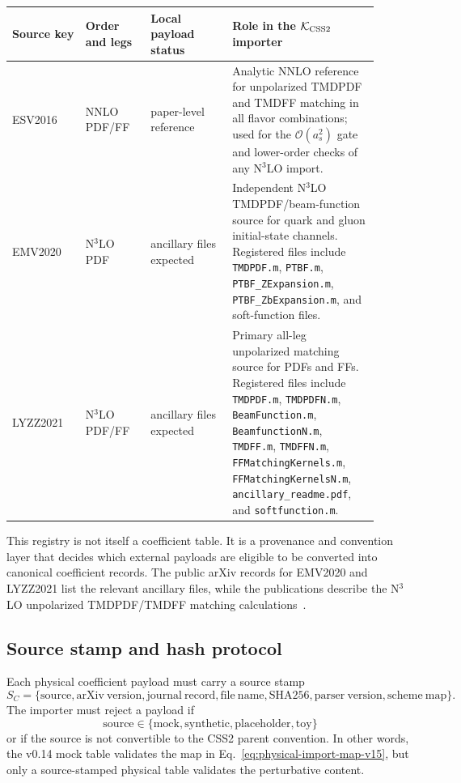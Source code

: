 \documentclass[11pt]{article}
\newcommand{\order}[1]{\mathcal{O}\!\left(#1\right)}
\newcommand{\KCSS}{\mathcal K_{\rm CSS2}}
\begin{document}
\begin{center}\small
\begin{tabular}{>{\raggedright\arraybackslash}p{0.18\linewidth}
                >{\raggedright\arraybackslash}p{0.16\linewidth}
                >{\raggedright\arraybackslash}p{0.20\linewidth}
                >{\raggedright\arraybackslash}p{0.36\linewidth}}
\toprule
Source key & Order and legs & Local payload status & Role in the $\KCSS$ importer \\
\midrule
ESV2016 & NNLO PDF/FF & paper-level reference & Analytic NNLO reference for unpolarized TMDPDF and TMDFF matching in all flavor combinations; used for the $\order{a_s^2}$ gate and lower-order checks of any N$^3$LO import. \\
EMV2020 & N$^3$LO PDF & ancillary files expected & Independent N$^3$LO TMDPDF/beam-function source for quark and gluon initial-state channels.  Registered files include \texttt{TMDPDF.m}, \texttt{PTBF.m}, \texttt{PTBF\_ZExpansion.m}, \texttt{PTBF\_ZbExpansion.m}, and soft-function files. \\
LYZZ2021 & N$^3$LO PDF/FF & ancillary files expected & Primary all-leg unpolarized matching source for PDFs and FFs. Registered files include \texttt{TMDPDF.m}, \texttt{TMDPDFN.m}, \texttt{BeamFunction.m}, \texttt{BeamfunctionN.m}, \texttt{TMDFF.m}, \texttt{TMDFFN.m}, \texttt{FFMatchingKernels.m}, \texttt{FFMatchingKernelsN.m}, \texttt{ancillary\_readme.pdf}, and \texttt{softfunction.m}. \\
\bottomrule
\end{tabular}
\end{center}

This registry is not itself a coefficient table.  It is a provenance and convention layer
that decides which external payloads are eligible to be converted into canonical
coefficient records.  The public arXiv records for EMV2020 and LYZZ2021 list the relevant
ancillary files, while the publications describe the N$^3$LO unpolarized TMDPDF/TMDFF
matching calculations~\cite{EbertMistlbergerVita2020,LuoYangZhuZhu2021}.

\subsection{Source stamp and hash protocol}

Each physical coefficient payload must carry a source stamp
\begin{equation}
  S_C=\{\mathrm{source},\mathrm{arXiv\ version},\mathrm{journal\ record},
  \mathrm{file\ name},\mathrm{SHA256},\mathrm{parser\ version},
  \mathrm{scheme\ map}\} .
  \label{eq:source-stamp-v15}
\end{equation}
The importer must reject a payload if
\begin{equation}
  \mathrm{source}\in\{\mathrm{mock},\mathrm{synthetic},\mathrm{placeholder},\mathrm{toy}\}
  \label{eq:reject-mock-source-v15}
\end{equation}
or if the source is not convertible to the CSS2 parent convention.  In other words, the
v0.14 mock table validates the map in Eq.~\eqref{eq:physical-import-map-v15}, but only a
source-stamped physical table validates the perturbative content.
\end{document}
